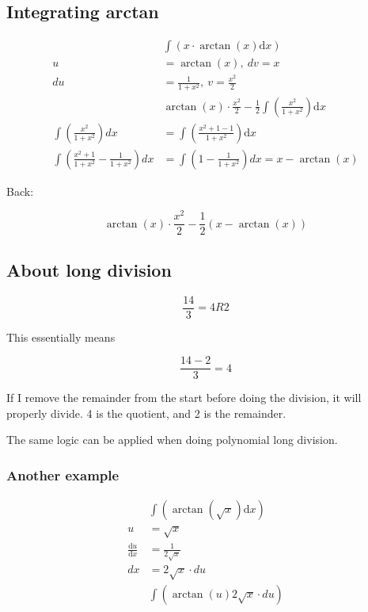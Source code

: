 \documentclass[12pt]{article}
\theoremstyle{plain}
\theoremstyle{remark}
\theoremstyle{definition}
\begin{document}
\subsection{Integrating arctan}

\begin{align*}
&\int\left( x \cdot \arctan(x)\text{d}x \right) \\
u &= \arctan(x),\ dv = x \\
du &= \frac{1}{1 + x^{2}},\ v = \frac{x^{2}}{2} \\
&\arctan(x) \cdot \frac{x^{2}}{2} - \frac{1}{2}\int\left( \frac{x^{2}}{1 + x^{2}} \right)\text{d}x
 \\
\int\left( \frac{x^{2}}{1 + x^{2}} \right)dx &= \int\left( \frac{x^{2} + 1 - 1}{1 + x^{2}} \right)\text{d}x \\
\int\left( \frac{x^{2} + 1}{1 + x^{2}} - \frac{1}{1 + x^{2}} \right)dx &= \int\left( 1 - \frac{1}{1 + x^{2}} \right)dx = x - \arctan(x)
\end{align*}


Back:

\[\arctan(x) \cdot \frac{x^{2}}{2} - \frac{1}{2}\left( x - \arctan(x) \right)\]


\subsection{About long division}

\[\frac{14}{3} = 4R2\]

This essentially means

\[\frac{14 - 2}{3} = 4\]

If I remove the remainder from the start before doing the division, it
will properly divide. 4 is the quotient, and 2 is the remainder.

The same logic can be applied when doing polynomial long division.



\subsubsection{Another example}

\begin{align*}
&\int\left( \arctan\left( \sqrt{x} \right)\text{d}x \right) \\
u &= \sqrt{x} \\
\frac{\text{d}u}{\text{d}x} &= \frac{1}{2\sqrt{x}} \\
dx &= 2\sqrt{x} \cdot du \\
&\int\left( \arctan(u)2\sqrt{x} \cdot du \right)
\end{align*}
\end{document}

